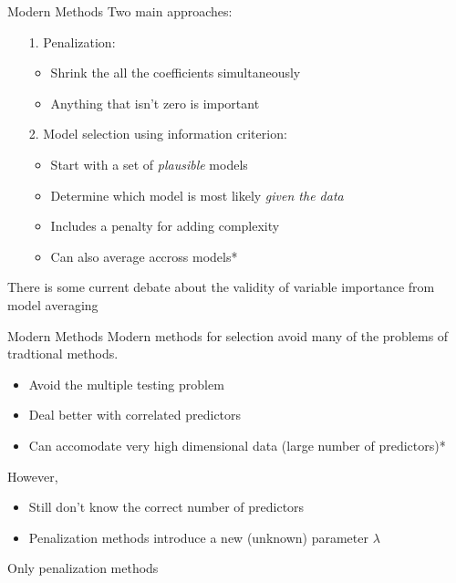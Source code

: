 \documentclass{beamer}\usepackage[]{graphicx}\usepackage[]{color}
\begin{document}
\begin{frame}{Modern Methods}
Two main approaches:
\bigskip
\begin{itemize}
\item[1.] Penalization:
  \begin{itemize}
  \item Shrink the all the coefficients simultaneously
  \item Anything that isn't zero is important
  \end{itemize}
\pause
\bigskip

\item[2.] Model selection using information criterion:
  \begin{itemize}
  \item Start with a set of \emph{plausible} models
  \item Determine which model is most likely \emph{given the data}
  \item Includes a penalty for adding complexity
  \item Can also average accross models*
  \end{itemize}
\end{itemize}
\pause

\bigskip
{\small*There is some current debate about the validity of variable importance from model averaging}
\end{frame}

\begin{frame}{Modern Methods}
Modern methods for selection avoid many of the problems of tradtional methods.
\bigskip
  \begin{itemize}
  \item Avoid the multiple testing problem
  \item Deal better with correlated predictors
  \item Can accomodate very high dimensional data (large number of predictors)*
  \end{itemize}
\bigskip
\pause
However, 
\smallskip
\begin{itemize}
  \item Still don't know the correct number of predictors
  \item Penalization methods introduce a new (unknown) parameter $\lambda$ 
\end{itemize}

\bigskip
{\small *Only penalization methods}
\end{frame}
\end{document}
